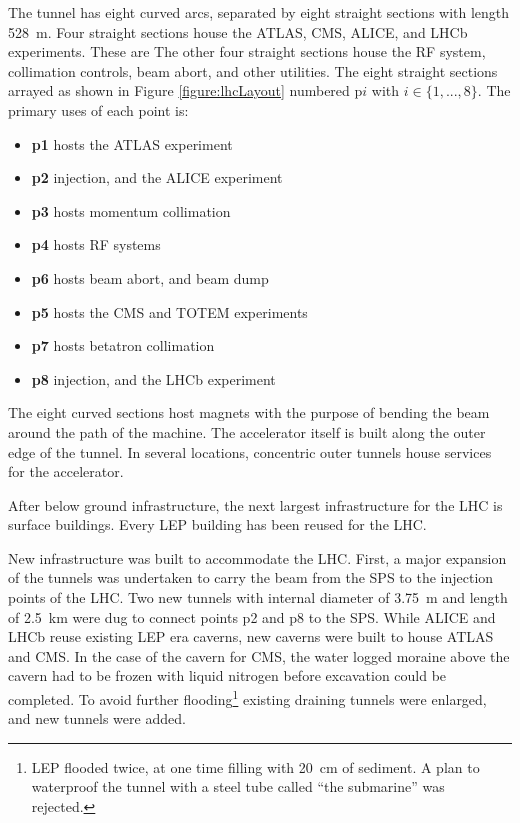 The tunnel has eight curved arcs, separated by eight straight sections with length 528~m. \cite{lyndon}
Four straight sections house the ATLAS, CMS, ALICE, and LHCb experiments. These are 
The other four straight sections house the RF system, collimation controls, beam abort, and other utilities.
The eight straight sections arrayed as shown in Figure \ref{figure:lhcLayout} numbered p$i$ with $i\in\{1,...,8\}$.
The primary uses of each point is:
\begin{itemize}
    \item \textbf{p1} hosts the ATLAS experiment
    \item \textbf{p2} injection, and the ALICE experiment
    \item \textbf{p3} hosts momentum collimation
    \item \textbf{p4} hosts RF systems
    \item \textbf{p6} hosts beam abort, and beam dump
    \item \textbf{p5} hosts the CMS and TOTEM experiments
    \item \textbf{p7} hosts betatron collimation
    \item \textbf{p8} injection, and the LHCb experiment
\end{itemize}
The eight curved sections host magnets with the purpose of bending the beam around the path of the machine.
The accelerator itself is built along the outer edge of the tunnel. In several locations, concentric outer tunnels house services for the accelerator.

After below ground infrastructure, the next largest infrastructure for the LHC is surface buildings.
Every LEP building has been reused for the LHC.

New infrastructure was built to accommodate the LHC.
First, a major expansion of the tunnels was undertaken to carry the beam from the SPS to the injection points of the LHC. Two new tunnels with internal diameter of 3.75~m and length of 2.5~km were dug to connect points p2 and p8 to the SPS.
While ALICE and LHCb reuse existing LEP era caverns, new caverns were built to house ATLAS and CMS.
In the case of the cavern for CMS, the water logged moraine above the cavern had to be frozen with liquid nitrogen before excavation could be completed.
To avoid further flooding\footnote{LEP flooded twice, at one time filling with 20~cm of sediment. A plan to waterproof the tunnel with a steel tube called ``the submarine'' was rejected.} existing draining tunnels were enlarged, and new tunnels were added.

